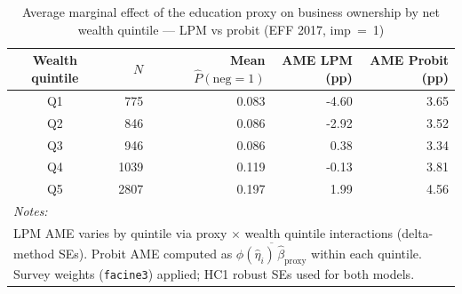 \begin{table}[!h]

\caption{\label{tab:ame_quintile_probit}Average marginal effect of the education proxy on business ownership by net wealth quintile --- LPM vs probit (EFF 2017, imp~=~1)}
\centering
\begin{tabular}[t]{crrrr}
\toprule
Wealth quintile & $N$ & Mean $\hat{P}(\text{neg}=1)$ & AME LPM (pp) & AME Probit (pp)\\
\midrule
Q1 & 775 & 0.083 & -4.60 & 3.65\\
Q2 & 846 & 0.086 & -2.92 & 3.52\\
Q3 & 946 & 0.086 & 0.38 & 3.34\\
Q4 & 1039 & 0.119 & -0.13 & 3.81\\
Q5 & 2807 & 0.197 & 1.99 & 4.56\\
\bottomrule
\multicolumn{5}{l}{\rule{0pt}{1em}\textit{Notes: }}\\
\multicolumn{5}{l}{\rule{0pt}{1em}LPM AME varies by quintile via proxy $\times$ wealth quintile interactions (delta-method SEs). Probit AME computed as $\overline{\phi(\hat{\eta}_i)\,\hat{\beta}_{\text{proxy}}}$ within each quintile. Survey weights (\texttt{facine3}) applied; HC1 robust SEs used for both models.}\\
\end{tabular}
\end{table}
